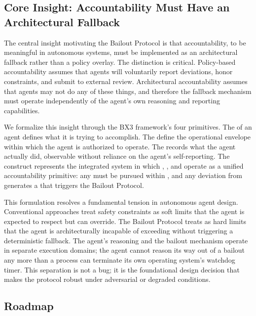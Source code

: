 \subsection{Core Insight: Accountability Must Have an Architectural Fallback}

The central insight motivating the Bailout Protocol is that accountability, to be meaningful in autonomous systems, must be implemented as an architectural fallback rather than a policy overlay. The distinction is critical. Policy-based accountability assumes that agents will voluntarily report deviations, honor constraints, and submit to external review. Architectural accountability assumes that agents may not do any of these things, and therefore the fallback mechanism must operate independently of the agent's own reasoning and reporting capabilities.

We formalize this insight through the BX3 framework's four primitives. The \purpose of an agent defines what it is trying to accomplish. The \bounds define the operational envelope within which the agent is authorized to operate. The \fact records what the agent actually did, observable without reliance on the agent's self-reporting. The \bxthree construct represents the integrated system in which \purpose, \bounds, and \fact operate as a unified accountability primitive: any \purpose must be pursued within \bounds, and any deviation from \bounds generates a \fact that triggers the Bailout Protocol.

This formulation resolves a fundamental tension in autonomous agent design. Conventional approaches treat safety constraints as soft limits that the agent is expected to respect but can override. The Bailout Protocol treats \bounds as hard limits that the agent is architecturally incapable of exceeding without triggering a deterministic fallback. The agent's reasoning and the bailout mechanism operate in separate execution domains; the agent cannot reason its way out of a bailout any more than a process can terminate its own operating system's watchdog timer. This separation is not a bug; it is the foundational design decision that makes the protocol robust under adversarial or degraded conditions.

\subsection{Roadmap}


